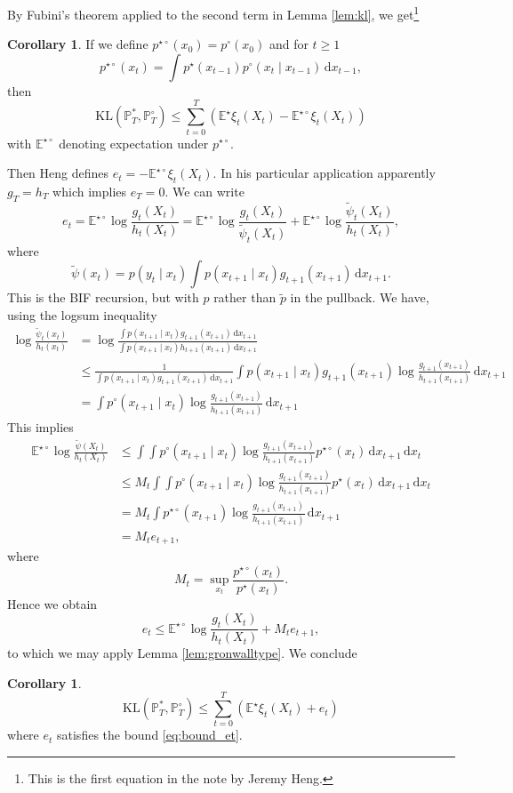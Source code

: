 \documentclass[11pt,reqno]{amsart}
\newcommand{\dd}{{\,\mathrm d}}
\newcommand{\EE}{\mathbb{E}}
\theoremstyle{definition}
\newtheorem{cor}[thm]{Corollary}
\begin{document}
By Fubini's theorem applied to the second term in Lemma \ref{lem:kl}, we get\footnote{This is the first equation in the note by Jeremy Heng.}
\begin{cor}
If we define $p^{\star\circ}(x_0)=p^\circ(x_0)$ and for $t\ge 1$
\[ p^{\star\circ}(x_t) = \int p^\star(x_{t-1}) p^\circ(x_t \mid x_{t-1}) 	\dd x_{t-1}, \]
then
\[	\text{KL}(\mathbb{P}_T^*, \mathbb{P}_T^\circ) \le \sum_{t=0}^T \left(\EE^\star \xi_t(X_t) - \EE^{\star\circ} \xi_t(X_t)\right)
\]
with $\EE^{\star\circ}$ denoting expectation under $p^{\star\circ}$. 
\end{cor}
Then Heng defines $e_t = - \EE^{\star\circ} \xi_t(X_t)$. In his particular application apparently $g_T=h_T$ which implies   $e_T=0$.
We can write
\[ e_t = \EE^{\star\circ} \log \frac{g_t(X_t)}{h_t(X_t)} =\EE^{\star\circ} \log \frac{g_t(X_t)}{\tilde\psi_t(X_t)}+\EE^{\star\circ} \log \frac{\tilde\psi_t(X_t)}{h_t(X_t)}, \]
where 
\[ \tilde\psi(x_t) = p(y_t \mid x_t) \int p(x_{t+1}\mid x_t) g_{t+1}(x_{t+1}) \dd x_{t+1}. \]
This is the BIF recursion, but with $p$ rather than $\tilde p$ in the pullback. 
We have, using the logsum inequality
\begin{align*}
\log 	\frac{\tilde\psi_t(x_t)}{h_t(x_t)} &= \log \frac{\int p(x_{t+1}\mid x_t) g_{t+1}(x_{t+1}) \dd x_{t+1}}{\int p(x_{t+1}\mid x_t) h_{t+1}(x_{t+1}) \dd x_{t+1}}\\  & \le 
\frac1{\int p(x_{t+1}\mid x_t) g_{t+1}(x_{t+1}) \dd x_{t+1}} {\int p(x_{t+1}\mid x_t) g_{t+1}(x_{t+1})
\log \frac{g_{t+1}(x_{t+1})}{h_{t+1}(x_{t+1})}
 \dd x_{t+1}}\\ & = \int p^\circ(x_{t+1}\mid x_t)  \log \frac{g_{t+1}(x_{t+1})}{h_{t+1}(x_{t+1})}\dd x_{t+1}
\end{align*}
This implies 
\begin{align*}
	\EE^{\star\circ} \log \frac{\tilde\psi(X_t)}{h_t(X_t)} & \le \int \int p^\circ(x_{t+1}\mid x_t)  \log \frac{g_{t+1}(x_{t+1})}{h_{t+1}(x_{t+1})} p^{\star\circ}(x_t) \dd x_{t+1}\dd x_t  \\ & \le 
	M_t \int \int p^\circ(x_{t+1}\mid x_t)  \log \frac{g_{t+1}(x_{t+1})}{h_{t+1}(x_{t+1})} p^{\star}(x_t)\dd x_{t+1}  \dd x_t\\ &=
	M_t \int p^{\star\circ}(x_{t+1})  \log \frac{g_{t+1}(x_{t+1})}{h_{t+1}(x_{t+1})} \dd x_{t+1}\\&= M_t e_{t+1},
\end{align*}
where 
\[M_t = \sup_{x_t} \frac{p^{\star\circ}(x_t)}{p^\star(x_t)}.\]
Hence we obtain 
\begin{equation}\label{eq:bound_et}
	e_t \le \EE^{\star\circ} \log \frac{g_t(X_t)}{h_t(X_t)} + M_t e_{t+1},
\end{equation} 
to which we may apply Lemma \ref{lem:gronwalltype}. 
We conclude 
\begin{cor}
\[ \text{KL}(\mathbb{P}_T^*, \mathbb{P}_T^\circ) \le \sum_{t=0}^T\left(\EE^\star \xi_t(X_t) + e_t \right)  \]
where $e_t$ satisfies the bound \eqref{eq:bound_et}. 	
\end{cor}
\end{document}

